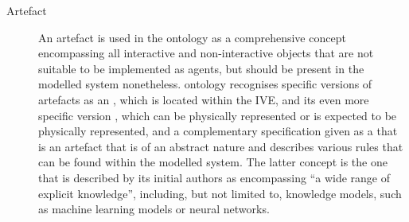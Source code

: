 \begin{description}
    \item [Artefact] An artefact is used in the  ontology as a comprehensive concept encompassing all interactive and non-interactive objects that are not suitable to be implemented as agents, but should be present in the modelled system nonetheless.  ontology recognises specific versions of artefacts as an , which is located within the \ac{IVE}, and its even more specific version , which can be physically represented or is expected to be physically represented, and a complementary specification given as a  that is an artefact that is of an abstract nature and describes various rules that can be found within the modelled system. The latter concept is the one that is described by its initial authors as encompassing \enquote{a wide range of explicit knowledge}, including, but not limited to, knowledge models, such as machine learning models or neural networks.
\end{description}
